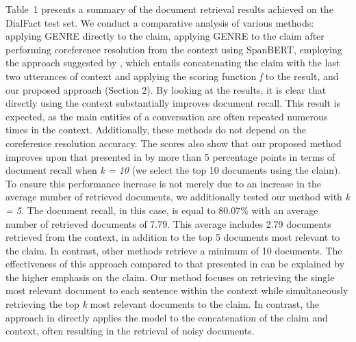 Table~1 presents a summary of the document retrieval results achieved on the DialFact test set. We conduct a comparative analysis of various methods: applying GENRE directly to the claim, applying GENRE to the claim after performing coreference resolution from the context using SpanBERT, employing the approach suggested by \citet{dialfact}, which entails concatenating the claim with the last two utterances of context and applying the scoring function \textit{f} to the result, and our proposed approach (Section 2). By looking at the results, it is clear that directly using the context substantially improves document recall. This result is expected, as the main entities of a conversation are often repeated numerous times in the context. Additionally, these methods do not depend on the coreference resolution accuracy. The scores also show that our proposed method improves upon that presented in \citet{dialfact} by more than 5 percentage points in terms of document recall when \textit{k = 10} (we select the top 10 documents using the claim). To ensure this performance increase is not merely due to an increase in the average number of retrieved documents, we additionally tested our method with \textit{k = 5}. The document recall, in this case, is equal to 80.07\% with an average number of retrieved documents of 7.79. This average includes 2.79 documents retrieved from the context, in addition to the top 5 documents most relevant to the claim. In contrast, other methods retrieve a minimum of 10 documents. The effectiveness of this approach compared to that presented in \citet{dialfact} can be explained by the higher emphasis on the claim. Our method focuses on retrieving the single most relevant document to each sentence within the context while simultaneously retrieving the top \textit{k} most relevant documents to the claim. In contrast, the approach in \citet{dialfact} directly applies the model to the concatenation of the claim and context, often resulting in the retrieval of noisy documents. 



